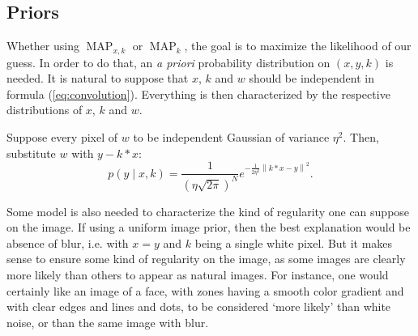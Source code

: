 \documentclass[english,a4paper]{article}
\theoremstyle{plain}
\theoremstyle{definition}
\theoremstyle{remark}
\DeclareMathOperator{\MAP}{MAP}
\newcommand{\norm}[1]{\left\lVert #1 \right\rVert}
\begin{document}
\subsection{Priors}

Whether using $\MAP_{x,k}$ or $\MAP_k$, the goal is to maximize the likelihood of our guess. In order to do that, an \emph{a priori} probability distribution on $(x,y,k)$ is needed.
It is natural to suppose that $x$, $k$ and $w$ should be independent in formula (\ref{eq:convolution}). Everything is then characterized by the respective distributions of $x$, $k$ and $w$.

Suppose every pixel of $w$ to be independent Gaussian of variance $\eta^2$. Then, substitute $w$ with $y-k*x$:
\begin{equation}\label{eq:p_y|x,k}
p(y\mid x,k) = \frac{1}{(\eta\sqrt{2\pi})^N} e^{-\frac{1}{2\eta^2}\norm{k*x-y}^2} .
\end{equation}

Some model is also needed to characterize the kind of regularity one can suppose on the image.
If using a uniform image prior, then the best explanation would be absence of blur, i.e. with $x = y$ and $k$ being a single white pixel. But it makes sense to ensure some kind of regularity on the image, as some images are clearly more likely than others to appear as natural images.
For instance, one would certainly like an image of a face, with zones having a smooth color gradient and with clear edges and lines and dots, to be considered `more likely' than white noise, or than the same image with blur.
\end{document}
